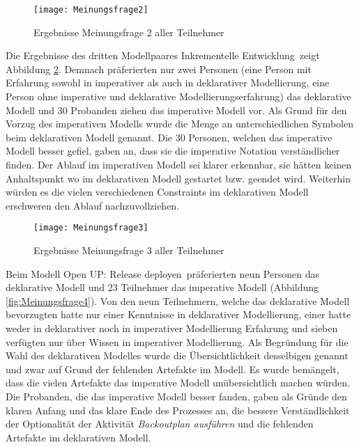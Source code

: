 \begin{figure}[htp]
\begin{center}
  \texttt{[image: Meinungsfrage2]} %
  \caption{Ergebnisse Meinungsfrage 2 aller Teilnehmer}
  \label{fig:Meinungsfrage2}
\end{center}
\end{figure}

Die Ergebnisse des dritten Modellpaares \grqq Inkrementelle Entwicklung\grqq \ zeigt Abbildung \ref{fig:Meinungsfrage3}. Demnach präferierten nur zwei Personen (eine Person mit Erfahrung sowohl in imperativer als auch in deklarativer Modellierung, eine Person ohne imperative und deklarative Modellierungserfahrung) das deklarative Modell und 30 Probanden ziehen das imperative Modell vor.\newline
Als Grund für den Vorzug des imperativen Modells wurde die Menge an unterschiedlichen Symbolen beim deklarativen Modell genannt. \newline
Die 30 Personen, welchen das imperative Modell besser gefiel, gaben an, dass sie die imperative Notation verständlicher finden. Der Ablauf im imperativen Modell sei klarer erkennbar, sie hätten keinen Anhaltspunkt wo im deklarativen Modell gestartet bzw. geendet wird. Weiterhin würden es die vielen verschiedenen Constraints im deklarativen Modell erschweren den Ablauf nachzuvollziehen.\newline

\begin{figure}[htp]
\begin{center}
  \texttt{[image: Meinungsfrage3]} %
  \caption{Ergebnisse Meinungsfrage 3 aller Teilnehmer}
  \label{fig:Meinungsfrage3}
\end{center}
\end{figure}

Beim Modell \grqq Open UP: Release deployen\grqq \ präferierten neun Personen das deklarative Modell und 23 Teilnehmer das imperative Modell (Abbildung \ref{fig:Meinungsfrage4}). Von den neun Teilnehmern, welche das deklarative Modell bevorzugten hatte nur einer Kenntnisse in deklarativer Modellierung, einer hatte weder in deklarativer noch in imperativer Modellierung Erfahrung und sieben verfügten nur über Wissen in imperativer Modellierung. \newline
Als Begründung für die Wahl des deklarativen Modelles wurde die Übersichtlichkeit desselbigen genannt und zwar auf Grund der fehlenden Artefakte im Modell. Es wurde bemängelt, dass die vielen Artefakte das imperative Modell unübersichtlich machen würden.\newline
Die Probanden, die das imperative Modell besser fanden, gaben als Gründe den klaren Anfang und das klare Ende des Prozesses an, die bessere Verständlichkeit der Optionalität der Aktivität \textit{Backoutplan ausführen} und die fehlenden Artefakte im deklarativen Modell. \newline



